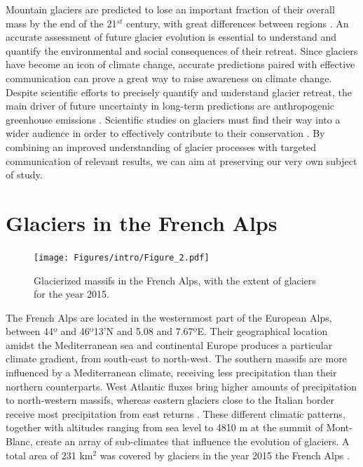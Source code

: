 Mountain glaciers are predicted to lose an important fraction of their overall mass by the end of the 21$^{st}$ century, with great differences between regions \citep{hock_glaciermip_2019}. An accurate assessment of future glacier evolution is essential to understand and quantify the environmental and social consequences of their retreat. Since glaciers have become an icon of climate change, accurate predictions paired with effective communication can prove a great way to raise awareness on climate change. Despite scientific efforts to precisely quantify and understand glacier retreat, the main driver of future uncertainty in long-term predictions are anthropogenic greenhouse emissions \citep{marzeion_partitioning_2020}. Scientific studies on glaciers must find their way into a wider audience in order to effectively contribute to their conservation \citep{moser_communicating_2010}. By combining an improved understanding of glacier processes with targeted communication of relevant results, we can aim at preserving our very own subject of study.  

\section{Glaciers in the French Alps}

\begin{figure}
\centering
\texttt{[image: Figures/intro/Figure\_2.pdf]}
\caption{Glacierized massifs in the French Alps, with the extent of glaciers for the year 2015.}
\label{intro:fig2}
\end{figure}

The French Alps are located in the westernmost part of the European Alps, between 44º and 46º13'N and 5.08 and 7.67ºE. Their geographical location amidst the Mediterranean sea and continental Europe produces a particular climate gradient, from south-east to north-west. The southern massifs are more influenced by a Mediterranean climate, receiving less precipitation than their northern counterparts. West Atlantic fluxes bring higher amounts of precipitation to north-western massifs, whereas eastern glaciers close to the Italian border receive most precipitation from east returns \citep{durand_reanalysis_2009}. These different climatic patterns, together with altitudes ranging from sea level to 4810 m at the summit of Mont-Blanc, create an array of sub-climates that influence the evolution of glaciers. A total area of 231 km$^{2}$ was covered by glaciers in the year 2015 the French Alps \citep[with 2015 update]{gardent_multitemporal_2014}.


